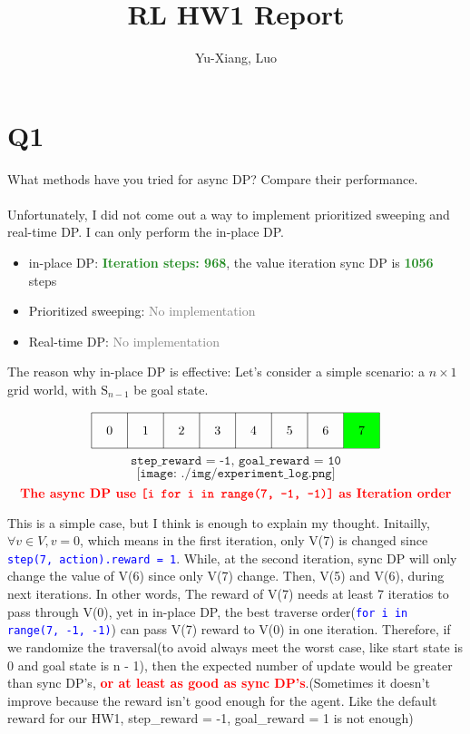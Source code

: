 \documentclass[12pt]{extarticle}
\title{RL HW1 Report}
\author{Yu-Xiang, Luo}
\begin{document}
\maketitle
\section*{Q1}
What methods have you tried for async DP? Compare their performance.\\
\\
Unfortunately, I did not come out a way to implement prioritized sweeping and real-time DP. I can only perform the in-place DP.
\begin{itemize}
	\item in-place DP: \textcolor{ForestGreen}{\textbf{Iteration steps: 968}}, the value iteration sync DP is \textcolor{ForestGreen}{\textbf{1056}} steps
	\item Prioritized sweeping: \textcolor{gray}{No implementation}
	\item Real-time DP: \textcolor{gray}{No implementation}
\end{itemize}
\newpage
The reason why in-place DP is effective:
Let's consider a simple scenario: a $n \times 1$ grid world, with $\text{S}_{n-1}$ be goal state.

\[
	\begin{tikzpicture}
		\foreach \y in {0,1}
		\draw (0,\y) -- (8,\y);

		\foreach \x in {0,1,2,3,4,5,6,7,8}
		\draw (\x,0) -- (\x,1);
		\node at (0.5, 0.5) {0};
		\node at (1.5, 0.5) {1};
		\node at (2.5, 0.5) {2};
		\node at (3.5, 0.5) {3};
		\node at (4.5, 0.5) {4};
		\node at (5.5, 0.5) {5};
		\node at (6.5, 0.5) {6};
		\fill[green] (7,0) rectangle (8,1);
		\node at (7.5, 0.5) {7};
	\end{tikzpicture}
\]
\[
	\texttt{step\_reward = -1, goal\_reward = 10}
\]
\[
	\texttt{[image: ./img/experiment\_log.png]}
\]
\[
	\textbf{\textcolor{red}{\text{The async DP use }\texttt{[i for i in range(7, -1, -1)]}\text{ as Iteration order}}}
\]

This is a simple case, but I think is enough to explain my thought. Initailly, $\forall v \in V, v = 0$, which means in the first iteration, only V(7) is changed since \texttt{\textcolor{blue}{step(7, action).reward = 1}}. While, at the second iteration, sync DP will only change the value of V(6) since only V(7) change. Then, V(5) and V(6), during next iterations. In other words, The reward of V(7) needs at least 7 iteratios to pass through V(0), yet in in-place DP, the best traverse order(\texttt{\textcolor{blue}{for i in range(7, -1, -1)}}) can pass V(7) reward to V(0) in one iteration. Therefore, if we randomize the traversal(to avoid always meet the worst case, like start state is 0 and goal state is n - 1), then the expected number of update would be greater than sync DP's, \textbf{\textcolor{red}{or at least as good as sync DP's}}.(Sometimes it doesn't improve because the reward isn't good enough for the agent. Like the default reward for our HW1, step\_reward = -1, goal\_reward = 1 is not enough)
\end{document}

